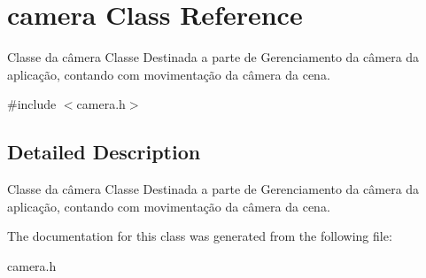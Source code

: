 \hypertarget{classcamera}{\section{camera Class Reference}
\label{classcamera}
}


Classe da câmera Classe Destinada a parte de Gerenciamento da câmera da aplicação, contando com movimentação da câmera da cena.  




{\ttfamily \#include $<$camera.\-h$>$}



\subsection{Detailed Description}
Classe da câmera Classe Destinada a parte de Gerenciamento da câmera da aplicação, contando com movimentação da câmera da cena. 

The documentation for this class was generated from the following file\-:\begin{DoxyCompactItemize}
\item 
camera.\-h\end{DoxyCompactItemize}
